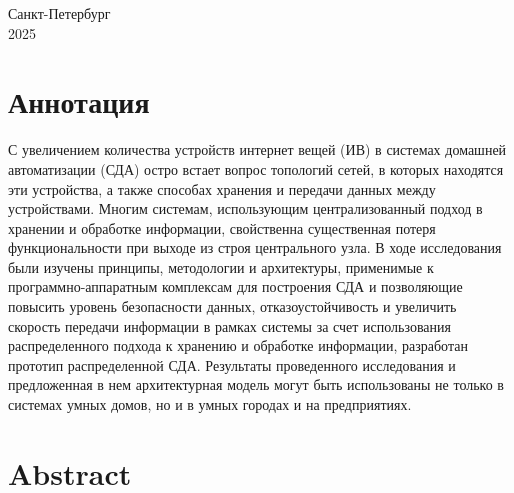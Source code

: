 \documentclass[a4paper,12pt]{article}
\begin{document}
\begin{titlepage}

    \vspace{\fill}

    \begin{center}
    Санкт-Петербург\\ 2025
    \end{center}

\end{titlepage}

\section*{Аннотация}

С увеличением количества устройств интернет вещей (ИВ) в системах домашней автоматизации (СДА) остро встает вопрос топологий сетей, в которых находятся эти устройства, а также способах хранения и передачи данных между устройствами. Многим системам, использующим централизованный подход в хранении и обработке информации, свойственна существенная потеря функциональности при выходе из строя центрального узла. В ходе исследования были изучены принципы, методологии и архитектуры, применимые к программно-аппаратным комплексам для построения СДА и позволяющие повысить уровень безопасности данных, отказоустойчивость и увеличить скорость передачи информации в рамках системы за счет использования распределенного подхода к хранению и обработке информации, разработан прототип распределенной СДА. Результаты проведенного исследования и предложенная в нем архитектурная модель могут быть использованы не только в системах умных домов, но и в умных городах и на предприятиях.

\section*{Abstract}
\end{document}

